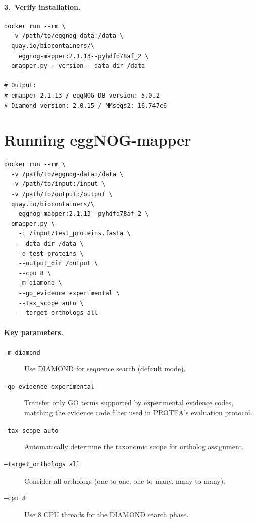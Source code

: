 \paragraph{3.\ Verify installation.}
\begin{verbatim}
docker run --rm \
  -v /path/to/eggnog-data:/data \
  quay.io/biocontainers/\
    eggnog-mapper:2.1.13--pyhdfd78af_2 \
  emapper.py --version --data_dir /data

# Output:
# emapper-2.1.13 / eggNOG DB version: 5.0.2
# Diamond version: 2.0.15 / MMseqs2: 16.747c6
\end{verbatim}

\section{Running eggNOG-mapper}
\label{app:ext-emapper-run}

\begin{verbatim}
docker run --rm \
  -v /path/to/eggnog-data:/data \
  -v /path/to/input:/input \
  -v /path/to/output:/output \
  quay.io/biocontainers/\
    eggnog-mapper:2.1.13--pyhdfd78af_2 \
  emapper.py \
    -i /input/test_proteins.fasta \
    --data_dir /data \
    -o test_proteins \
    --output_dir /output \
    --cpu 8 \
    -m diamond \
    --go_evidence experimental \
    --tax_scope auto \
    --target_orthologs all
\end{verbatim}

\paragraph{Key parameters.}
\begin{description}
  \item[\texttt{-m diamond}] Use DIAMOND for sequence search (default mode).
  \item[\texttt{--go\_evidence experimental}] Transfer only GO terms supported
    by experimental evidence codes, matching the evidence code filter used in
    PROTEA's evaluation protocol.
  \item[\texttt{--tax\_scope auto}] Automatically determine the taxonomic scope
    for ortholog assignment.
  \item[\texttt{--target\_orthologs all}] Consider all orthologs (one-to-one,
    one-to-many, many-to-many).
  \item[\texttt{--cpu 8}] Use 8 CPU threads for the DIAMOND search phase.
\end{description}

